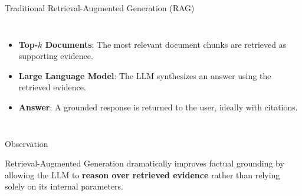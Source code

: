 \documentclass[aspectratio=169]{beamer}
\begin{document}
\begin{frame}{Traditional Retrieval-Augmented Generation (RAG)}
\begin{columns}[T]
\begin{itemize}
\vspace{0.05cm}

\item \textbf{Top-$k$ Documents}:
The most relevant document chunks are retrieved as supporting evidence.

\vspace{0.05cm}

\item \textbf{Large Language Model}:
The LLM synthesizes an answer using the retrieved evidence.

\vspace{0.05cm}

\item \textbf{Answer}:
A grounded response is returned to the user, ideally with citations.

\end{itemize}

\end{columns}

\vspace{-0.05cm}

\begin{block}{Observation}

Retrieval-Augmented Generation dramatically improves factual grounding by
allowing the LLM to {\bf reason over retrieved evidence} rather than relying
solely on its internal parameters.

\end{block}

\end{frame}
\end{document}
